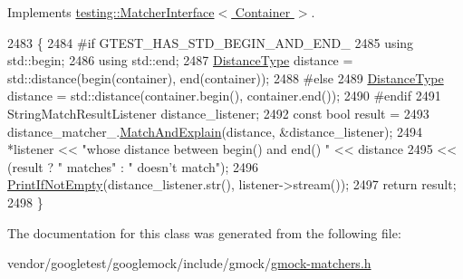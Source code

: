 Implements \hyperlink{classtesting_1_1MatcherInterface_a296b43607cd99d60365f0e6a762777cf}{testing\+::\+Matcher\+Interface$<$ Container $>$}.


\begin{DoxyCode}
2483                                                                       \{
2484 \textcolor{preprocessor}{#if GTEST\_HAS\_STD\_BEGIN\_AND\_END\_}
2485       \textcolor{keyword}{using} std::begin;
2486       \textcolor{keyword}{using} std::end;
2487       \hyperlink{classtesting_1_1internal_1_1BeginEndDistanceIsMatcher_1_1Impl_a10d901c49e2793dae6bcce6fa1a4e9fe}{DistanceType} distance = std::distance(begin(container), end(container));
2488 \textcolor{preprocessor}{#else}
2489       \hyperlink{classtesting_1_1internal_1_1BeginEndDistanceIsMatcher_1_1Impl_a10d901c49e2793dae6bcce6fa1a4e9fe}{DistanceType} distance = std::distance(container.begin(), container.end());
2490 \textcolor{preprocessor}{#endif}
2491       StringMatchResultListener distance\_listener;
2492       \textcolor{keyword}{const} \textcolor{keywordtype}{bool} result =
2493           distance\_matcher\_.\hyperlink{classtesting_1_1internal_1_1MatcherBase_ae3f5f3150a95cafb1c2ab7c864a42e65}{MatchAndExplain}(distance, &distance\_listener);
2494       *listener << \textcolor{stringliteral}{"whose distance between begin() and end() "} << distance
2495                 << (result ? \textcolor{stringliteral}{" matches"} : \textcolor{stringliteral}{" doesn't match"});
2496       \hyperlink{namespacetesting_1_1internal_a77c9e2b66d2b2414db4763971180d53c}{PrintIfNotEmpty}(distance\_listener.str(), listener->stream());
2497       \textcolor{keywordflow}{return} result;
2498     \}
\end{DoxyCode}


The documentation for this class was generated from the following file\+:\begin{DoxyCompactItemize}
\item 
vendor/googletest/googlemock/include/gmock/\hyperlink{gmock-matchers_8h}{gmock-\/matchers.\+h}\end{DoxyCompactItemize}
